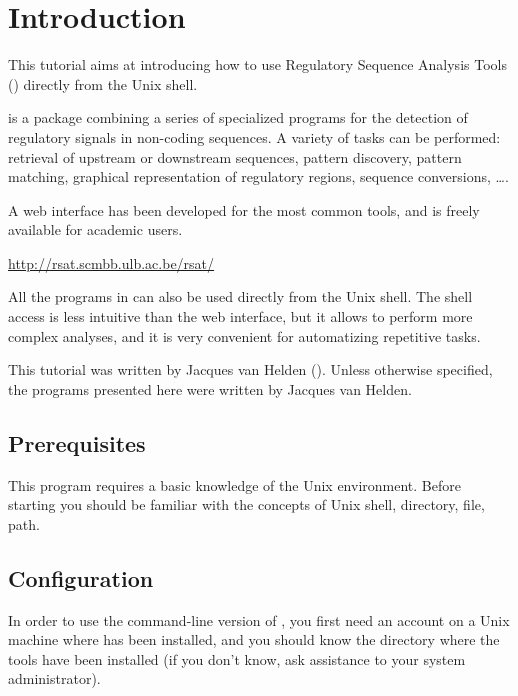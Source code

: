 
\chapter{Introduction}

This tutorial aims at introducing how to use Regulatory Sequence
Analysis Tools (\RSAT) directly from the Unix shell.

\RSAT is a package combining a series of specialized programs for the
detection of regulatory signals in non-coding sequences. A variety of
tasks can be performed: retrieval of upstream or downstream sequences,
pattern discovery, pattern matching, graphical representation of
regulatory regions, sequence conversions, \ldots.

A web interface has been developed for the most common tools, and is
freely available for academic users.

\url{http://rsat.scmbb.ulb.ac.be/rsat/}

All the programs in \RSAT can also be used directly from the Unix
shell. The shell access is less intuitive than the web interface, but
it allows to perform more complex analyses, and it is very convenient
for automatizing repetitive tasks.

This tutorial was written by Jacques van Helden
().  Unless otherwise specified,
the programs presented here were written by Jacques van Helden.

\section{Prerequisites}

This program requires a basic knowledge of the Unix
environment. Before starting you should be familiar with the concepts
of Unix shell, directory, file, path.

\section{Configuration}

In order to use the command-line version of \RSAT, you first need an
account on a Unix machine where \RSAT has been installed, and you
should know the directory where the tools have been installed (if you
don't know, ask assistance to your system administrator).


